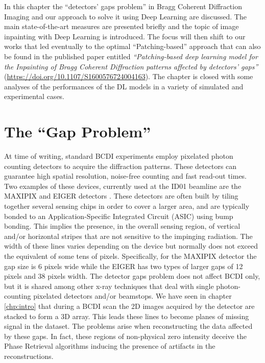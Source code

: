 
In this chapter the ``detectors' gaps problem'' in Bragg Coherent Diffraction Imaging and our approach to solve it
using Deep Learning are discussed. The main state-of-the-art measures are presented briefly and
the topic of image inpainting with Deep Learning is introduced. The focus will then shift to our works that led
eventually to the optimal ``Patching-based'' approach that can also be found in the published paper entitled
 \textit{``Patching-based deep learning model for the Inpainting of Bragg Coherent Diffraction patterns affected 
 by detectors' gaps''} (\url{https://doi.org/10.1107/S1600576724004163}). The chapter is closed with some analyses 
 of the performances of the DL models in a variety of simulated and experimental cases.  

\section{The ``Gap Problem''}\label{sec:gaps}

At time of writing, standard BCDI experiments employ pixelated photon counting detectors to acquire the diffraction
patterns. These detectors can guarantee high spatial resolution, noise-free counting and fast read-out times. Two examples 
of these devices, currently used at the ID01 beamline are the MAXIPIX and EIGER detectors \cite{ponchut_maxipix_2011, Eiger_Johnson_2014}.
These detectors are often built by tiling together several sensing chips in order to cover a larger area, and are
typically bonded to an Application-Specific Integrated Circuit (ASIC) using bump bonding. 
This implies the presence, in the overall sensing region, of vertical and/or horizontal stripes that are not sensitive
to the impinging radiation. The width of these lines varies depending on the device but normally does not exceed the equivalent 
of some tens of pixels. Specifically, for the MAXIPIX detector the gap size is 6 pixels wide while the EIGER has two types of larger gaps of
12 pixels and 38 pixels width.
The detector gaps problem does not affect BCDI only, but it is shared among other x-ray techniques that deal with single photon-counting
pixelated detectors and/or beamstops.
We have seen in chapter \ref{chp:intro} that during a BCDI scan the 2D images acquired by the detector are stacked to form
a 3D array. This leads these lines to become planes of missing signal in the dataset.
The problems arise when reconstructing the data affected by these gaps. In fact, these regions of non-physical zero intensity
deceive the Phase Retrieval algorithms inducing the presence of artifacts in the reconstructions\cite{carnis_towards_2019}.

